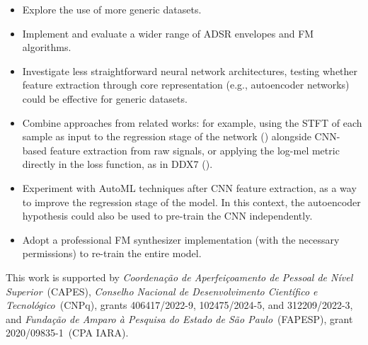 \documentclass[sigconf,natbib=false]{acmart}
\begin{document}
\begin{itemize}
\item Explore the use of more generic datasets.
\item Implement and evaluate a wider range of ADSR envelopes and FM algorithms.
\item Investigate less straightforward neural network architectures, testing whether feature extraction through core representation (e.g., autoencoder networks) could be effective for generic datasets.
\item Combine approaches from related works: for example, using the STFT of each sample as input to the regression stage of the network (\textcite{claesson2021resynthesis}) alongside CNN-based feature extraction from raw signals, or applying the log-mel metric directly in the loss function, as in DDX7 (\textcite{steinmetz2022ddx7}).
\item Experiment with AutoML techniques after CNN feature extraction, as a way to improve the regression stage of the model. In this context, the autoencoder hypothesis could also be used to pre-train the CNN independently.
\item Adopt a professional FM synthesizer implementation (with the necessary permissions) to re-train the entire model.
\end{itemize}

\begin{acks}
This work is supported by \textit{Coordenação de Aperfeiçoamento de Pessoal de Nível Superior}~(CAPES), \textit{Conselho Nacional de Desenvolvimento Científico e Tecnológico}~(CNPq), grants 406417/2022-9, 102475/2024-5, and 312209/2022-3, and \textit{Fundação de Amparo à Pesquisa do Estado de São Paulo}~(FAPESP), grant 2020/09835-1~(CPA IARA). 
\end{acks}


\printbibliography
\end{document}

